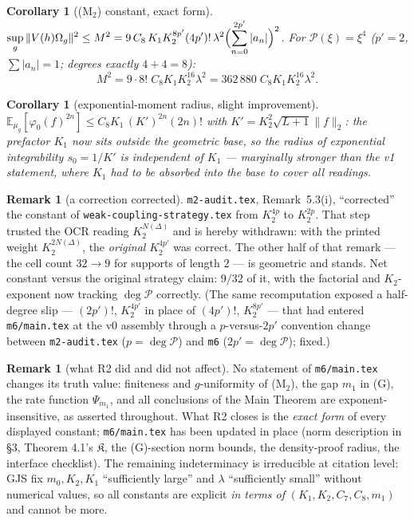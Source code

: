 \documentclass[11pt,a4paper]{article}
\theoremstyle{plain}
\newtheorem{corollary}[theorem]{Corollary}
\theoremstyle{definition}
\newtheorem{remark}[theorem]{Remark}
\newcommand{\E}{\mathbb{E}}
\newcommand{\Om}{\Omega}
\begin{document}
\begin{corollary}[(M$_2$) constant, exact form]\label{cor:M2}
$\displaystyle\sup_{g}\|V(h)\Om_g\|^2\le M^2=9\,C_8\,K_1K_2^{8p'}(4p')!\,\lambda^2
\Bigl(\sum_{n=0}^{2p'}|a_n|\Bigr)^2$. For $\mathscr P(\xi)=\xi^4$ ($p'=2$, $\sum|a_n|=1$;
degrees exactly $4{+}4=8$):
\[
  M^2=9\cdot8!\;C_8K_1K_2^{16}\lambda^2=362\,880\;C_8K_1K_2^{16}\lambda^2 .
\]
\end{corollary}

\begin{corollary}[exponential-moment radius, slight improvement]\label{cor:dense}
$\E_{\mu_g}[\varphi_0(f)^{2n}]\le C_8K_1\,(K')^{2n}(2n)!$ with $K'=K_2^{2}\sqrt{L+1}\|f\|_2$:
the prefactor $K_1$ now sits \emph{outside} the geometric base, so the radius of exponential
integrability $s_0=1/K'$ is independent of $K_1$ --- marginally stronger than the v1 statement,
where $K_1$ had to be absorbed into the base to cover all readings.
\end{corollary}

\begin{remark}[a correction corrected]\label{rem:mea}
\texttt{m2-audit.tex}, Remark~5.3(i), ``corrected'' the constant of
\texttt{weak-coupling-strategy.tex} from $K_2^{4p}$ to $K_2^{2p}$. That step trusted the OCR
reading $K_2^{N(\Delta)}$ and is hereby withdrawn: with the printed weight $K_2^{2N(\Delta)}$,
the \emph{original} $K_2^{4p'}$ was correct. The other half of that remark --- the cell count
$32\to9$ for supports of length $2$ --- is geometric and stands. Net constant versus the
original strategy claim: $9/32$ of it, with the factorial and $K_2$-exponent now tracking
$\deg\mathscr P$ correctly. (The same recomputation exposed a half-degree slip
--- $(2p')!$, $K_2^{4p'}$ in place of $(4p')!$, $K_2^{8p'}$ --- that had entered
\texttt{m6/main.tex} at the v0 assembly through a $p$-versus-$2p'$ convention change between
\texttt{m2-audit.tex} ($p=\deg\mathscr P$) and \texttt{m6} ($2p'=\deg\mathscr P$); fixed.)
\end{remark}

\begin{remark}[what R2 did and did not affect]\label{rem:scope}
No statement of \texttt{m6/main.tex} changes its truth value: finiteness and $g$-uniformity of
(M$_2$), the gap $m_1$ in (G), the rate function $\Psi_{m_1}$, and all conclusions of the Main
Theorem are exponent-insensitive, as asserted throughout. What R2 closes is the \emph{exact
form} of every displayed constant; \texttt{m6/main.tex} has been updated in place (norm
description in \S3, Theorem 4.1's $\mathfrak K$, the (G)-section norm bounds, the density-proof
radius, the interface checklist). The remaining indeterminacy is irreducible at citation level:
GJS fix $m_0,K_2,K_1$ ``sufficiently large'' and $\lambda$ ``sufficiently small'' without
numerical values, so all constants are explicit \emph{in terms of} $(K_1,K_2,C_7,C_8,m_1)$ and
cannot be more.
\end{remark}
\end{document}
